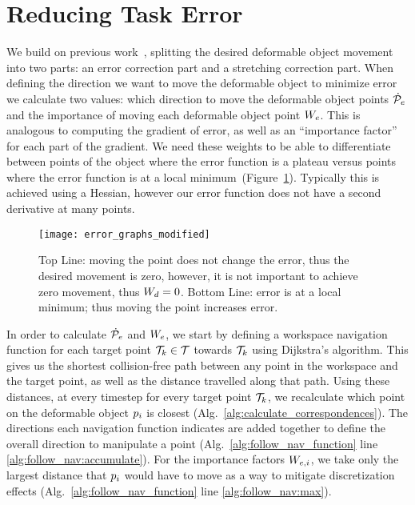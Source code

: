 \section{Reducing Task Error}
\label{sec:reducing_error}

We build on previous work~\cite{Berenson2013}, splitting the desired deformable object movement into two parts: an error correction part and a stretching correction part. When defining the direction we want to move the deformable object to minimize error we calculate two values: which direction to move the deformable object points $\dot{\mathcal{P}}_e$ and the importance of moving each deformable object point $W_e$. This is analogous to computing the gradient of error, as well as an ``importance factor'' for each part of the gradient. We need these weights to be able to differentiate between points of the object where the error function is a plateau versus points where the error function is at a local minimum~(Figure~\ref{fig:error_examples}). Typically this is achieved using a Hessian, however our error function does not have a second derivative at many points. 

\begin{figure}[h!]
    \centering
    \texttt{[image: error\_graphs\_modified]}
    \caption{Top Line: moving the point does not change the error, thus the desired movement is zero, however, it is not important to achieve zero movement, thus $W_d = 0$.  Bottom Line: error is at a local minimum; thus moving the point increases error.}
    \label{fig:error_examples}
\end{figure}

In order to calculate $\dot{\mathcal{P}}_e$ and $W_e$, we start by defining a workspace navigation function for each target point $\mathcal{T}_k \in \mathcal{T}$ towards $\mathcal{T}_k$ using Dijkstra's algorithm. This gives us the shortest collision-free path between any point in the workspace and the target point, as well as the distance travelled along that path. Using these distances, at every timestep for every target point $\mathcal{T}_k$, we recalculate which point on the deformable object $p_i$ is closest (Alg.~\ref{alg:calculate_correspondences}). The directions each navigation function indicates are added together to define the overall direction to manipulate a point (Alg.~\ref{alg:follow_nav_function} line \ref{alg:follow_nav:accumulate}). For the importance factors $W_{e,i}$, we take only the largest distance that $p_i$ would have to move as a way to mitigate discretization effects (Alg.~\ref{alg:follow_nav_function} line \ref{alg:follow_nav:max}).

